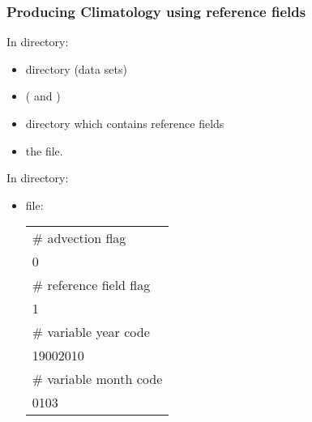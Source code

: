 

\begin{frame}
\frametitle{Producing Climatology using reference fields}

\centerline{In  directory:}
\begin{itemize}
\item {} directory (data sets)
\item {} ( and )
\item {} directory which contains reference fields
\item the  file.
\end{itemize}

\centerline{In  directory:}

\begin{itemize}
\item {} file:
\small{
\begin{tabular}{|l|}
\hline
\# advection flag\\
0\\
\# reference field flag\\
1\\
\# variable year code \\
19002010\\
\# variable month code\\
0103\\
\hline
\end{tabular}
}
\end{itemize}
\end{frame}


